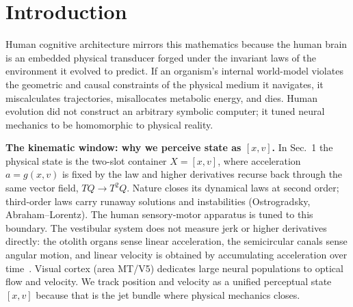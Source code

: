 \documentclass[10pt]{article}
\begin{document}
\begin{abstract}
the law forces; finiteness of that weight remains open. A closing sketch states the cognitive-evolutionary hypothesis that motivates the program and the evidence that supports it. This note develops the foundational mathematical structure from which the full field dynamics are intended to be mapped. The construction of those dynamics is an active research effort, not a result asserted here; further field equations, dynamical regimes, and gravitational extensions fall beyond the present scope.
\end{abstract}

\section*{Introduction}

Human cognitive architecture mirrors this mathematics because the human brain is an embedded physical transducer forged under the invariant laws of the environment it evolved to predict. If an organism's internal world-model violates the geometric and causal constraints of the physical medium it navigates, it miscalculates trajectories, misallocates metabolic energy, and dies. Human evolution did not construct an arbitrary symbolic computer; it tuned neural mechanics to be homomorphic to physical reality.

\smallskip
\noindent\textbf{The kinematic window: why we perceive state as $[x,v]$.} In Sec.~1 the physical state is the two-slot container $X=[x,v]$, where acceleration $a=g(x,v)$ is fixed by the law and higher derivatives recurse back through the same vector field, $TQ\to T^2Q$. Nature closes its dynamical laws at second order; third-order laws carry runaway solutions and instabilities (Ostrogradsky, Abraham--Lorentz). The human sensory-motor apparatus is tuned to this boundary. The vestibular system does not measure jerk or higher derivatives directly: the otolith organs sense linear acceleration, the semicircular canals sense angular motion, and linear velocity is obtained by accumulating acceleration over time~\cite{angelaki}. Visual cortex (area MT/V5) dedicates large neural populations to optical flow and velocity. We track position and velocity as a unified perceptual state $[x,v]$ because that is the jet bundle where physical mechanics closes.
\end{document}
